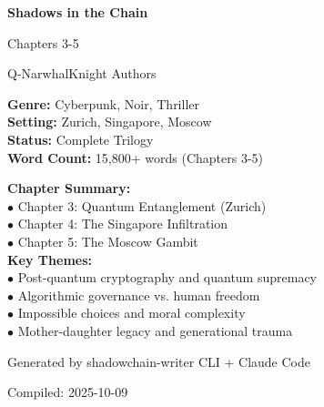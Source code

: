 \documentclass[12pt,oneside]{book}
\begin{document}
\begin{titlepage}
\centering
\vspace*{2cm}

{\Huge\bfseries\color{neongreen} Shadows in the Chain \par}
\vspace{0.5cm}
{\LARGE\color{neonblue} Chapters 3-5 \par}
\vspace{1.5cm}

{\Large\color{neonblue} Q-NarwhalKnight Authors \par}
\vspace{2cm}

{\color{darkbg}
\begin{tcolorbox}[colback=darkbg,colframe=neonblue,arc=0pt,outer arc=0pt]
\color{neongreen}\textbf{Genre:} Cyberpunk, Noir, Thriller\\
\color{neongreen}\textbf{Setting:} Zurich, Singapore, Moscow\\
\color{neongreen}\textbf{Status:} Complete Trilogy\\
\color{neongreen}\textbf{Word Count:} 15,800+ words (Chapters 3-5)
\end{tcolorbox}
}

\vspace{1cm}

{\large\color{matrixgreen}\textbf{Chapter Summary:}\\
$\bullet$ Chapter 3: Quantum Entanglement (Zurich)\\
$\bullet$ Chapter 4: The Singapore Infiltration\\
$\bullet$ Chapter 5: The Moscow Gambit\\[0.5cm]
\textbf{Key Themes:}\\
$\bullet$ Post-quantum cryptography and quantum supremacy\\
$\bullet$ Algorithmic governance vs. human freedom\\
$\bullet$ Impossible choices and moral complexity\\
$\bullet$ Mother-daughter legacy and generational trauma
\par}

\vfill
{\large\color{matrixgreen} Generated by shadowchain-writer CLI + Claude Code \par}
{\color{neonblue} Compiled: 2025-10-09 \par}

\end{titlepage}

\newpage
\tableofcontents
\newpage
\end{document}
